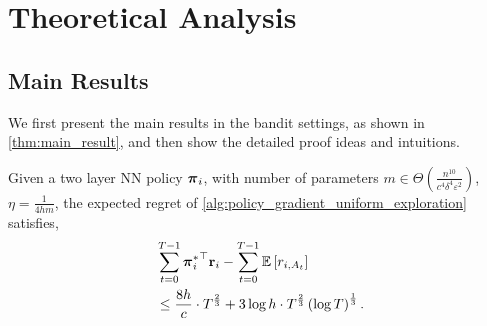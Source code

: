 \section{Theoretical Analysis}
\label{sec:theoretical_analysis}

\subsection{Main Results}
\label{subsec:main_results}

We first present the main results in the bandit settings, as shown in \cref{thm:main_result}, and then show the detailed proof ideas and  intuitions.

\begin{thm}
\label{thm:main_result}
    Given a two layer NN policy ${\boldsymbol{\pi}}_i$, with number of parameters $m \in \Theta\left( \frac{n^{10}}{c^4 \delta^4 \varepsilon^2} \right)$, $\eta = \frac{1}{4 h m}$, the expected regret of \cref{alg:policy_gradient_uniform_exploration} satisfies,
\begin{equation*}
\begin{split}
    &\sum\limits_{t=0}^{T-1}{ {{\boldsymbol{\pi}}_i^*}^\top {\mathbf{r}}_i } - \sum\limits_{t=0}^{T-1}{ {\mathbb{E}} \left[ r_{i, A_t} \right] } \\
    &\le \frac{8 h}{c} \cdot T^{\frac{2}{3}} + 3 \log{h} \cdot T^{\frac{2}{3}} \left(\log{T}\right)^{\frac{1}{3}}.
\end{split}
\end{equation*}
\end{thm}
